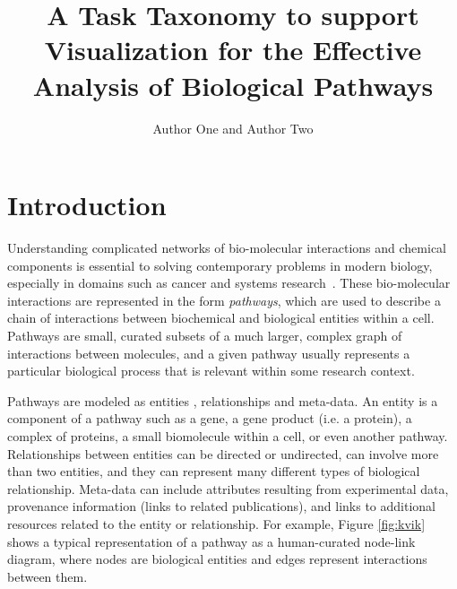\documentclass[journal]{vgtc}                %
\title{A Task Taxonomy to support Visualization for the Effective Analysis of Biological Pathways}
\author{Author One and Author Two}
\begin{document}


\maketitle


\section{Introduction}

Understanding complicated networks of bio-molecular interactions and chemical components is essential to solving contemporary problems in modern biology, especially in domains such as cancer and systems research~\cite{hanahan2011hallmarks}.
These bio-molecular interactions are represented in the form \emph{pathways}, which are used to describe a chain of interactions between biochemical and biological entities within a cell.
Pathways are small, curated subsets of a much larger, complex graph of interactions between molecules, and a given pathway usually represents a particular biological process that is relevant within some research context.

Pathways are modeled as entities , relationships and meta-data.
An entity is a component of a pathway such as a gene, a gene product (i.e. a protein), a complex of proteins, a small biomolecule within a cell, or even another pathway.
Relationships between entities can be directed or undirected, can involve more than two entities, and they can represent many different types of biological relationship.
Meta-data can include attributes resulting from experimental data, provenance information (links to related publications), and links to additional resources related to the entity or relationship.
For example, Figure \ref{fig:kvik} shows a typical representation of a pathway as a human-curated node-link diagram, where nodes are biological entities and edges represent interactions between them.
\end{document}
